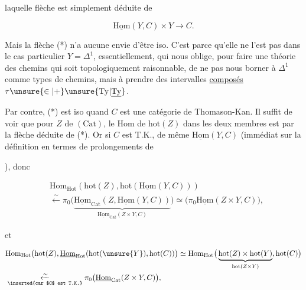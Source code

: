 laquelle flèche est simplement déduite de

\[
\underline{\mathrm{Hom}}(Y,C)\times Y\longrightarrow C.
\]

Mais la flèche (*) n'a aucune envie d'être iso. C'est parce qu'elle ne l'est  pas dans le cas particulier $Y=\Delta^1$, essentiellement, qui nous oblige, pour faire une théorie des chemins  qui soit topologiquement raisonnable, de ne pas nous borner à $\Delta^1$ comme types de chemins, mais à prendre des intervalles \uline{composés} $\tau\unsure{\in|+}\unsure{\mathrm{Ty}|\underline{\mathrm{Ty}}}$.


Par contre, (*) est iso quand $C$ est une catégorie de Thomason-Kan. Il suffit de voir que pour  $Z$ de $(\mathrm{Cat})$, le $\mathrm{Hom}$ de $\mathrm{hot}(Z)$ dans les deux membres est  par la flèche déduite de (*). Or si $C$ est T.K., de même $\underline{\mathrm{Hom}}(Y,C)$ (immédiat sur la définition  en termes de prolongements de 


), donc


\[
\begin{aligned}
&\mathrm{Hom}_{\mathrm{Hot}}(\mathrm{hot}(Z),\mathrm{hot}(\underline{\mathrm{Hom}}(Y,C)))\\
&\xleftarrow{\sim}\pi_0\big(\underbrace{\underline{\mathrm{Hom}}_{\mathrm{Cat}}(Z,\underline{\mathrm{Hom}}(Y,C))}_{\underline{\mathrm{Hom}}_{\mathrm{Cat}}(Z\times Y,C)}\big)
\simeq\big(\pi_0\underline{\mathrm{Hom}}(Z\times Y,C)\big),
\end{aligned}
\]

et 

\[
\begin{aligned}
&\mathrm{Hom}_{\mathrm{Hot}}\big(\mathrm{hot}(Z),\underline{\mathrm{Hom}}_{\mathrm{Hot}}(\mathrm{hot}(\unsure{Y}),\mathrm{hot}(C))\big)
\simeq\mathrm{Hom}_{\mathrm{Hot}}\big(\underbrace{\mathrm{hot}(Z)\times\mathrm{hot}(Y)}_{\mathrm{hot}(Z\times Y)},\mathrm{hot}(C)\big)\\
&\underset{\text{\inserted{car $C$ est T.K.}}}{\xleftarrow{\sim}}\pi_0\big(\underline{\mathrm{Hom}}_{\mathrm{Cat}}(Z\times Y,C)\big),
\end{aligned}
\]

